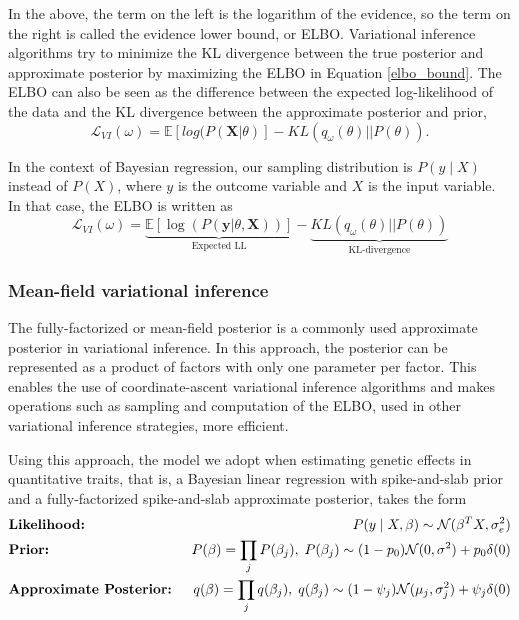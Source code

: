 %
In the above, the term on the left is the logarithm of the evidence, so the term on the right is called the evidence lower bound, or ELBO.
%
Variational inference algorithms try to minimize the KL divergence between the true posterior and approximate posterior by maximizing the ELBO in Equation \ref{elbo_bound}.
%
The ELBO can also be seen as the difference between the expected log-likelihood of the data and the KL divergence between the approximate posterior and prior,
\begin{equation}
    \mathcal{L}_{VI}(\omega) = \mathbb{E}[log(P( \textbf{X}|\theta)] - KL(q_{\omega}(\theta)||P(\theta)).
\end{equation}

%
In the context of Bayesian regression, our sampling distribution is $P(y \mid X)$ instead of $P(X)$, where $y$ is the outcome variable and $X$ is the input variable.
%
In that case, the ELBO is written as
\begin{equation}
    \mathcal{L}_{VI}(\omega) = \underbrace{\mathbb{E}[\log(P( \textbf{y}|\theta, \textbf{X}))]}_{\text{Expected LL}} - \underbrace{KL(q_{\omega}(\theta)||P(\theta))}_{\text{KL-divergence}}
    \label{elbo_blr}
\end{equation}

\subsubsection{Mean-field variational inference}

The fully-factorized or mean-field posterior is a commonly used approximate posterior in variational inference.
%
In this approach, the posterior can be represented as a product of factors with only one parameter per factor.
%
This enables the use of coordinate-ascent variational inference algorithms and makes operations such as sampling and computation of the ELBO, used in other variational inference strategies, more efficient.
%

%
Using this approach, the model we adopt when estimating genetic effects in quantitative traits, that is, a Bayesian linear regression with spike-and-slab prior and a fully-factorized spike-and-slab approximate posterior, takes the form
\begin{align}
    &\text{\textbf{Likelihood:} } &P(y \mid X, \beta) \sim \mathcal{N}(\beta^T X, \sigma_e^2) \nonumber \\
    &\text{\textbf{Prior:} } &P(\beta) = \prod_j P(\beta_j), \hspace{1mm} P(\beta_j) \sim (1-p_0)\mathcal{N} (0, \sigma ^ 2) + p_0 \delta(0) \nonumber \\
    &\text{\textbf{Approximate Posterior:} } &q(\beta) = \prod_j q(\beta_j), \hspace{1mm} q(\beta_j) \sim (1-\psi_j)\mathcal{N}(\mu_j, \sigma^2_j) + \psi_j \delta(0)
    \label{spike-and-slab-model}
\end{align}

